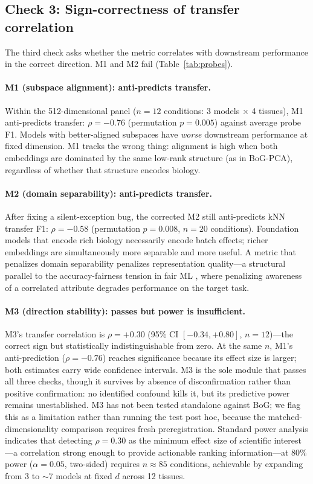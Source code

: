 \documentclass[10pt,letterpaper]{article}
\begin{document}
\subsection{Check 3: Sign-correctness of transfer correlation}

The third check asks whether the metric correlates with downstream performance in the correct direction. M1 and M2 fail (Table~\ref{tab:probes}).

\paragraph{M1 (subspace alignment): anti-predicts transfer.} Within the 512-dimensional panel ($n = 12$ conditions: 3 models $\times$ 4 tissues), M1 anti-predicts transfer: $\rho = -0.76$ (permutation $p = 0.005$) against average probe F1. Models with better-aligned subspaces have \emph{worse} downstream performance at fixed dimension. M1 tracks the wrong thing: alignment is high when both embeddings are dominated by the same low-rank structure (as in BoG-PCA), regardless of whether that structure encodes biology.

\paragraph{M2 (domain separability): anti-predicts transfer.} After fixing a silent-exception bug, the corrected M2 still anti-predicts kNN transfer F1: $\rho = -0.58$ (permutation $p = 0.008$, $n = 20$ conditions). Foundation models that encode rich biology necessarily encode batch effects; richer embeddings are simultaneously more separable and more useful. A metric that penalizes domain separability penalizes representation quality---a structural parallel to the accuracy-fairness tension in fair ML \citep{chouldechova2017impossibility}, where penalizing awareness of a correlated attribute degrades performance on the target task.

\paragraph{M3 (direction stability): passes but power is insufficient.} M3's transfer correlation is $\rho = +0.30$ (95\% CI $[-0.34, +0.80]$, $n = 12$)---the correct sign but statistically indistinguishable from zero. At the same $n$, M1's anti-prediction ($\rho = -0.76$) reaches significance because its effect size is larger; both estimates carry wide confidence intervals. M3 is the sole module that passes all three checks, though it survives by absence of disconfirmation rather than positive confirmation: no identified confound kills it, but its predictive power remains unestablished. M3 has not been tested standalone against BoG; we flag this as a limitation rather than running the test post hoc, because the matched-dimensionality comparison requires fresh preregistration. Standard power analysis indicates that detecting $\rho = 0.30$ as the minimum effect size of scientific interest---a correlation strong enough to provide actionable ranking information---at 80\% power ($\alpha = 0.05$, two-sided) requires $n \approx 85$ conditions, achievable by expanding from 3 to $\sim$7 models at fixed $d$ across 12 tissues.
\end{document}
